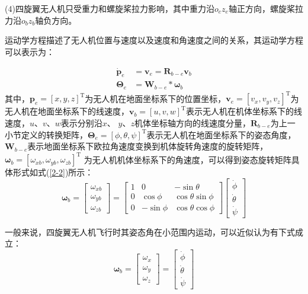 \documentclass[lang=chs, degree=master, blindreview=false, winfonts=true]{yanputhesis}
\begin{document}
(4)四旋翼无人机只受重力和螺旋桨拉力影响，其中重力沿$o_ez_e$轴正方向，螺旋桨拉力沿$o_bz_b$轴负方向。

运动学方程描述了无人机位置与速度以及速度和角速度之间的关系，其运动学方程可以表示为：

\begin{equation}
    \begin{aligned}
	\dot{\boldsymbol{p}}_e &= \boldsymbol{v}_e = \bm{R}_{b-e} \bm{v}_b \\
	\bm{\Theta}_e &= \bm{W}_{b-e} * \bm{\omega}_b
\end{aligned}\label{2-1}
\end{equation}
其中，$\boldsymbol{p}_e=\left[x,y,z\right]^\mathrm{T}$为无人机在地面坐标系下的位置坐标，$\boldsymbol{v}_e=\left[v_{x},v_{y},v_{z}\right]^\mathrm{T}$为无人机在地面坐标系下的线速度，$\boldsymbol{v}_b=\left[u,v,w\right]^\mathrm{T}$表示无人机在机体坐标系下的线速度，$u$、$v$、$w$表示分别沿$x$、
$y$、$z$机体坐标轴方向的线速度分量，$\boldsymbol{R}_{b-e}$为上一小节定义的转换矩阵，$\bm{\Theta}_e=\left[\phi,\theta,\psi\right]^\mathrm{T}$表示无人机在地面坐标系下的姿态角度，$\bm{W}_{b-e}$表示地面坐标系下欧拉角速度变换到机体旋转角速度的旋转矩阵，$\boldsymbol{\omega}_b=\left[{\omega}_{xb},{\omega}_{yb},{\omega}_{zb}\right]^\mathrm{T}$ 为无人机机体坐标系下的角速度，可以得到姿态旋转矩阵具体形式如式(\ref{2-2})所示：
\begin{equation}
	\boldsymbol{\omega}_b=\begin{bmatrix}\omega_{xb}\\\omega_{yb}\\\omega_{zb}\end{bmatrix}=\begin{bmatrix}1&0&-\sin\theta\\0&\cos\phi&\cos\theta\sin\phi\\0&-\sin\phi&\cos\theta\cos\phi\end{bmatrix}\begin{bmatrix}\dot\phi\\\dot\theta\\\dot\psi\end{bmatrix}
	\label{2-2}
\end{equation}



一般来说，四旋翼无人机飞行时其姿态角在小范围内运动，可以近似认为有下式成立：
\begin{equation}
	\boldsymbol{\omega}_b=\begin{bmatrix}{\omega}_x\\{\omega}_y\\{\omega}_z\end{bmatrix}=\begin{bmatrix}\dot{\phi}\\\dot{\theta}\\\dot{\psi}\end{bmatrix}
	\label{2-3}
\end{equation}
\end{document}
